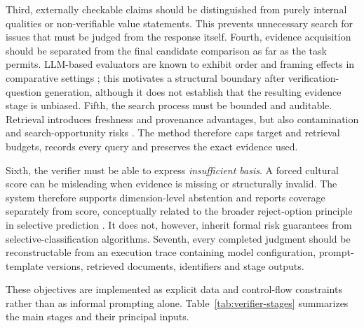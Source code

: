 Third, externally checkable claims should be distinguished from purely internal qualities or non-verifiable value statements. This prevents unnecessary search for issues that must be judged from the response itself. Fourth, evidence acquisition should be separated from the final candidate comparison as far as the task permits. LLM-based evaluators are known to exhibit order and framing effects in comparative settings \parencite{zheng2023llmjudge,wang2024notfairevaluators}; this motivates a structural boundary after verification-question generation, although it does not establish that the resulting evidence stage is unbiased. Fifth, the search process must be bounded and auditable. Retrieval introduces freshness and provenance advantages, but also contamination and search-opportunity risks \parencite{lewis2020rag,deng2024contamination}. The method therefore caps target and retrieval budgets, records every query and preserves the exact evidence used.

Sixth, the verifier must be able to express \emph{insufficient basis}. A forced cultural score can be misleading when evidence is missing or structurally invalid. The system therefore supports dimension-level abstention and reports coverage separately from score, conceptually related to the broader reject-option principle in selective prediction \parencite{geifman2017selective}. It does not, however, inherit formal risk guarantees from selective-classification algorithms. Seventh, every completed judgment should be reconstructable from an execution trace containing model configuration, prompt-template versions, retrieved documents, identifiers and stage outputs.

These objectives are implemented as explicit data and control-flow constraints rather than as informal prompting alone. Table~\ref{tab:verifier-stages} summarizes the main stages and their principal inputs.

